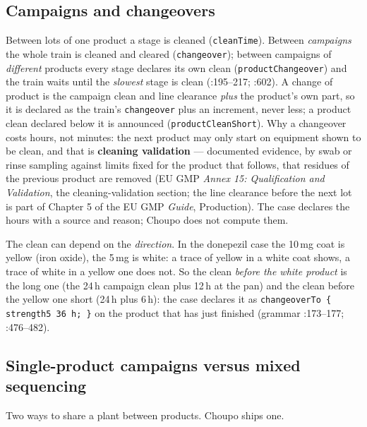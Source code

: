 \documentclass[11pt,a4paper]{article}
\begin{document}
\subsection{Campaigns and changeovers}\label{mp-campaigns}

Between lots of one product a stage is cleaned (\texttt{cleanTime}).
Between \emph{campaigns} the whole train is cleaned and cleared
(\texttt{changeover}); between campaigns of \emph{different} products
every stage declares its own clean (\texttt{productChangeover}) and the
train waits until the \emph{slowest} stage is clean
(:195--217; :602). A
change of product is the campaign clean and line clearance \emph{plus}
the product's own part, so it is declared as the train's
\texttt{changeover} plus an increment, never less; a product clean
declared below it is announced (\texttt{productCleanShort}). Why a
changeover costs hours, not minutes: the next product may only start on
equipment shown to be clean, and that is \textbf{cleaning validation}
--- documented evidence, by swab or rinse sampling against
limits fixed for the product that follows, that residues of the
previous product are removed (EU GMP \emph{Annex 15: Qualification and
Validation}, the cleaning-validation section; the line clearance
before the next lot is part of Chapter 5 of the EU GMP \emph{Guide},
Production). The case declares the hours with a source and reason;
Choupo does not compute them.

The clean can depend on the \emph{direction}. In the donepezil case the
10\,mg coat is yellow (iron oxide), the 5\,mg is white: a trace of
yellow in a white coat shows, a trace of white in a yellow one does not.
So the clean \emph{before the white product} is the long one (the 24\,h
campaign clean plus 12\,h at the pan) and the clean before the yellow one
short (24\,h plus 6\,h): the case
declares it as \texttt{changeoverTo \{ strength5 36 h; \}} on the
product that has just finished (grammar :173--177; :476--482).

\subsection{Single-product campaigns versus mixed
sequencing}\label{mp-sequencing}

Two ways to share a plant between products. Choupo ships one.
\end{document}

